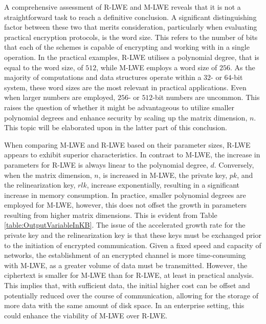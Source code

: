 A comprehensive assessment of R-LWE and M-LWE reveals that it is not a straightforward task to reach a definitive conclusion. A significant distinguishing factor between these two that merits consideration, particularly when evaluating practical encryption protocols, is the word size. This refers to the number of bits that each of the schemes is capable of encrypting and working with in a single operation. In the practical examples, R-LWE utilises a polynomial degree, that is equal to the word size, of $512$, while M-LWE employs a word size of $256$. As the majority of computations and data structures operate within a $32$- or $64$-bit system, these word sizes are the most relevant in practical applications. Even when larger numbers are employed, $256$- or $512$-bit numbers are uncommon. This raises the question of whether it might be advantageous to utilize smaller polynomial degrees and enhance security by scaling up the matrix dimension, $n$. This topic will be elaborated upon in the latter part of this conclusion.

When comparing M-LWE and R-LWE based on their parameter sizes, R-LWE appears to exhibit superior characteristics. In contrast to M-LWE, the increase in parameters for R-LWE is always linear to the polynomial degree, $d$. Conversely, when the matrix dimension, $n$, is increased in M-LWE, the private key, $pk$, and the relinearization key, $rlk$, increase exponentially, resulting in a significant increase in memory consumption. 
In practice, smaller polynomial degrees are employed for M-LWE, however, this does not offset the growth in parameters resulting from higher matrix dimensions. This is evident from Table \ref{table:OutputVariableInKB}. The issue of the accelerated growth rate for the private key and the relinearization key is that these keys must be exchanged prior to the initiation of encrypted communication. Given a fixed speed and capacity of networks, the establishment of an encrypted channel is more time-consuming with M-LWE, as a greater volume of data must be transmitted. However, the ciphertext is smaller for M-LWE than for R-LWE, at least in practical analysis. This implies that, with sufficient data, the initial higher cost can be offset and potentially reduced over the course of communication, allowing for the storage of more data with the same amount of disk space. In an enterprise setting, this could enhance the viability of M-LWE over R-LWE. 

